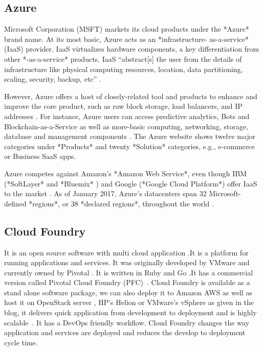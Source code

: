 \subsection{Azure}

    Microsoft Corporation (MSFT) markets its cloud products under the
    *Azure* brand name. At its most basic, Azure acts as an
    *infrastructure- as-a-service* (IaaS) provider.  IaaS virtualizes
    hardware components, a key differentiation from other
    *-as-a-service* products. IaaS ``abstract[s] the user from the
    details of infrastructure like physical computing resources,
    location, data partitioning, scaling, security, backup, etc''
    \cite{www-wikipedia-cloud}.

    However, Azure offers a host of closely-related tool and products
    to enhance and improve the core product, such as raw block
    storage, load balancers, and IP addresses
    \cite{www-azure-msft}. For instance, Azure users can access
    predictive analytics, Bots and Blockchain-as-a-Service
    as well as more-basic computing,
    networking, storage, database and management components
    \cite{www-sec-edgar-msft} \cite{www-azure-msft}.  The Azure website
    shows twelve major
    categories under *Products* and twenty *Solution* categories,
    e.g., e-commerce or Business SaaS apps.

    Azure competes against Amazon's *Amazon Web Service*,
    even though IBM (*SoftLayer*
    and *Bluemix* )
    and Google (*Google Cloud Platform*) offer IaaS to the
    market \cite{www-aws-amzn, www-softlayer-ibm,
    www-bluemix-ibm,www-cloud-google}.
    As of January 2017, Azure's datacenters
    span 32 Microsoft-defined *regions*, or 38 *declared regions*,
    throughout the world \cite{www-azure-msft}.

    \pv

\subsection{Cloud Foundry}

It is an open source software with multi cloud application .It is a
platform for running applications and services. It was originally
developed by VMware and currently owned by Pivotal . It is written in
Ruby and Go .It has a commercial version called Pivotal Cloud Foundry
(PFC)~\cite{www-cloudfoundry-book}. Cloud Foundry is available as a
stand alone software package, we can also deploy it to Amazon AWS as
well as host it on OpenStack server , HP’s Helion or VMware’s vSphere
as given in the blog, it delivers quick
application from development to deployment and is highly
scalable~\cite{www-cloudfoundry-blog}. It
has a DevOps friendly workflow.  Cloud Foundry changes the way
application and services are deployed and reduces the develop to
deployment cycle time.


